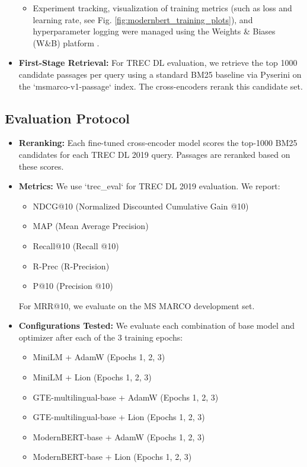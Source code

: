 \documentclass[conference]{IEEEtran}
\begin{document}
\begin{itemize}
\begin{itemize}
        \item Experiment tracking, visualization of training metrics (such as loss and learning rate, see Fig. \ref{fig:modernbert_training_plots}), and hyperparameter logging were managed using the Weights \& Biases (W\&B) platform \cite{wandb2020}.
    \end{itemize}

    \item \textbf{First-Stage Retrieval:} For TREC DL evaluation, we retrieve the top 1000 candidate passages per query using a standard BM25 baseline via Pyserini \cite{lin2021pyserini} on the `msmarco-v1-passage` index. The cross-encoders rerank this candidate set.
\end{itemize}

\subsection{Evaluation Protocol}
\begin{itemize}
    \item \textbf{Reranking:} Each fine-tuned cross-encoder model scores the top-1000 BM25 candidates for each TREC DL 2019 query. Passages are reranked based on these scores.
    \item \textbf{Metrics:} We use `trec\_eval` \cite{trec_eval_github} for TREC DL 2019 evaluation. We report:
        \begin{itemize}
            \item NDCG@10 (Normalized Discounted Cumulative Gain @10)
            \item MAP (Mean Average Precision)
            \item Recall@10 (Recall @10)
            \item R-Prec (R-Precision)
            \item P@10 (Precision @10)
        \end{itemize}
    For MRR@10, we evaluate on the MS MARCO development set.
    \item \textbf{Configurations Tested:} We evaluate each combination of base model and optimizer after each of the 3 training epochs:
        \begin{itemize}
            \item MiniLM + AdamW (Epochs 1, 2, 3)
            \item MiniLM + Lion (Epochs 1, 2, 3)
            \item GTE-multilingual-base + AdamW (Epochs 1, 2, 3)
            \item GTE-multilingual-base + Lion (Epochs 1, 2, 3)
            \item ModernBERT-base + AdamW (Epochs 1, 2, 3)
            \item ModernBERT-base + Lion (Epochs 1, 2, 3)
        \end{itemize}
\end{itemize}
\end{document}
